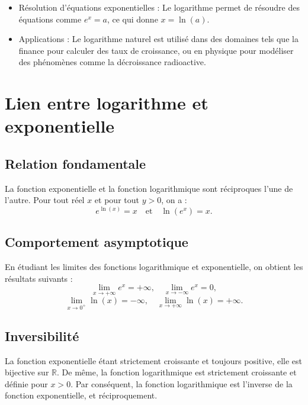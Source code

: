 \documentclass{article}
\begin{document}
	                                                                    \begin{itemize}
	                                                                    	\item Résolution d'équations exponentielles : Le logarithme permet de résoudre des équations comme \( e^x = a \), ce qui donne \( x = \ln(a) \).
	                                                                    	\item Applications : Le logarithme naturel est utilisé dans des domaines tels que la finance pour calculer des taux de croissance, ou en physique pour modéliser des phénomènes comme la décroissance radioactive.
	                                                                    \end{itemize}
	                                                                                                                                                                                  
	
	\section{Lien entre logarithme et exponentielle}
	
	\subsection{Relation fondamentale}
	
	La fonction exponentielle et la fonction logarithmique sont réciproques l'une de l'autre. Pour tout réel \( x \) et pour tout \( y > 0 \), on a :
	\[
	e^{\ln(x)} = x \quad \text{et} \quad \ln(e^x) = x.
	\]
	
	\subsection{Comportement asymptotique}
	
	En étudiant les limites des fonctions logarithmique et exponentielle, on obtient les résultats suivants :
	\[
	\lim_{x \to +\infty} e^x = +\infty, \quad \lim_{x \to -\infty} e^x = 0,
	\]
	\[
	\lim_{x \to 0^+} \ln(x) = -\infty, \quad \lim_{x \to +\infty} \ln(x) = +\infty.
	\]
	
	\subsection{Inversibilité}
	
	La fonction exponentielle étant strictement croissante et toujours positive, elle est bijective sur \( \mathbb{R} \). De même, la fonction logarithmique est strictement croissante et définie pour \( x > 0 \). Par conséquent, la fonction logarithmique est l'inverse de la fonction exponentielle, et réciproquement.
\end{document}
